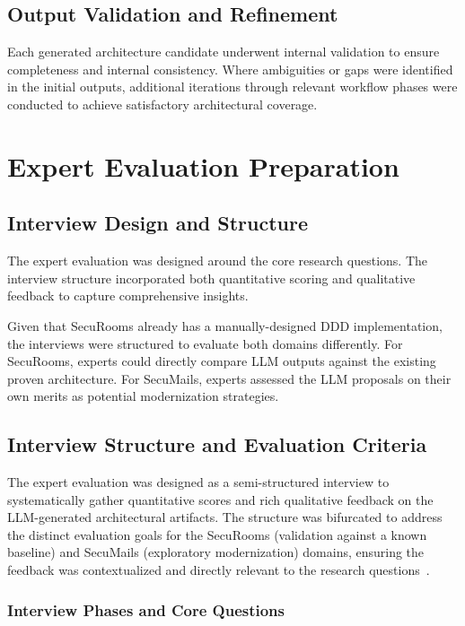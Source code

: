 \subsection{Output Validation and Refinement}
Each generated architecture candidate underwent internal validation to ensure completeness and internal consistency. Where ambiguities or gaps were identified in the initial outputs, additional iterations through relevant workflow phases were conducted to achieve satisfactory architectural coverage.

\section{Expert Evaluation Preparation}

\subsection{Interview Design and Structure}
The expert evaluation was designed around the core research questions. The interview structure incorporated both quantitative scoring and qualitative feedback to capture comprehensive insights.

Given that SecuRooms already has a manually-designed DDD implementation, the interviews were structured to evaluate both domains differently. For SecuRooms, experts could directly compare LLM outputs against the existing proven architecture. For SecuMails, experts assessed the LLM proposals on their own merits as potential modernization strategies.

\subsection{Interview Structure and Evaluation Criteria}
\label{sec:interview_structure}

The expert evaluation was designed as a semi-structured interview to systematically gather quantitative scores and rich qualitative feedback on the LLM-generated architectural artifacts. The structure was bifurcated to address the distinct evaluation goals for the SecuRooms (validation against a known baseline) and SecuMails (exploratory modernization) domains, ensuring the feedback was contextualized and directly relevant to the research questions~.

\subsubsection{Interview Phases and Core Questions}
\label{sec:interview_phases}

